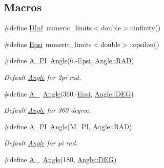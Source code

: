 \subsection*{Macros}
\begin{DoxyCompactItemize}
\item 
\#define \mbox{\hyperlink{maths_8hh_a995779faef78614d4f074b7d444de767}{D\+Inf}}~numeric\+\_\+limits$<$double$>$\+::infinity()
\item 
\#define \mbox{\hyperlink{maths_8hh_a78802b279ab85021d7f6bffe51621703}{Epsi}}~numeric\+\_\+limits$<$double$>$\+::epsilon()
\item 
\#define \mbox{\hyperlink{maths_8hh_ad7760000c41920a1ae5cf0f6bf0e4c77}{A\+\_\+PI}}~\mbox{\hyperlink{class_angle}{Angle}}(6.-\/\mbox{\hyperlink{maths_8hh_a78802b279ab85021d7f6bffe51621703}{Epsi}}, \mbox{\hyperlink{class_angle_a4f7b9849ce8780bcba95ca3ee45cff77a93ab6b68075fd7a6fe724fbde5b13c1f}{Angle\+::\+R\+AD}})
\begin{DoxyCompactList}\small\item\em Default \mbox{\hyperlink{class_angle}{Angle}} for 2pi rad. \end{DoxyCompactList}\item 
\#define \mbox{\hyperlink{maths_8hh_ae46eba4b5423f51b80f3446e128c6476}{A\+\_}}~\mbox{\hyperlink{class_angle}{Angle}}(360.-\/\mbox{\hyperlink{maths_8hh_a78802b279ab85021d7f6bffe51621703}{Epsi}}, \mbox{\hyperlink{class_angle_a4f7b9849ce8780bcba95ca3ee45cff77a65e2aa4bc05730c9c2e8fdaf73612282}{Angle\+::\+D\+EG}})
\begin{DoxyCompactList}\small\item\em Default \mbox{\hyperlink{class_angle}{Angle}} for 360 degree. \end{DoxyCompactList}\item 
\#define \mbox{\hyperlink{maths_8hh_ad37649758ce967343cee82772583fd9c}{A\+\_\+\+PI}}~\mbox{\hyperlink{class_angle}{Angle}}(M\+\_\+\+PI, \mbox{\hyperlink{class_angle_a4f7b9849ce8780bcba95ca3ee45cff77a93ab6b68075fd7a6fe724fbde5b13c1f}{Angle\+::\+R\+AD}})
\begin{DoxyCompactList}\small\item\em Default \mbox{\hyperlink{class_angle}{Angle}} for pi rad. \end{DoxyCompactList}\item 
\#define \mbox{\hyperlink{maths_8hh_ac37f3aecadc99641dd1c8b4c81d96f7e}{A\+\_}}~\mbox{\hyperlink{class_angle}{Angle}}(180, \mbox{\hyperlink{class_angle_a4f7b9849ce8780bcba95ca3ee45cff77a65e2aa4bc05730c9c2e8fdaf73612282}{Angle\+::\+D\+EG}})

\end{DoxyCompactItemize}
